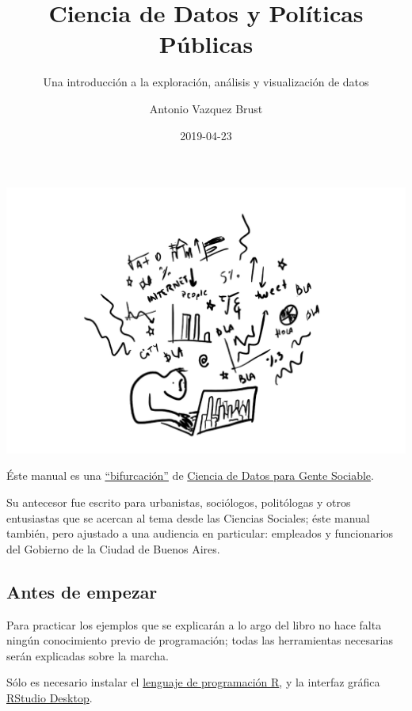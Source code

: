 \documentclass[]{book}
\title{Ciencia de Datos y Políticas Públicas}
\subtitle{Una introducción a la exploración, análisis y visualización de datos}
\author{Antonio Vazquez Brust}
\date{2019-04-23}
\begin{document}
\maketitle

{
\setcounter{tocdepth}{1}
\tableofcontents
}
\chapter*{}\label{section}

\includegraphics[width=1\linewidth]{imagenes/portada}

Éste manual es una
\href{https://es.wikipedia.org/wiki/Bifurcaci\%C3\%B3n_(desarrollo_de_software)}{``bifurcación''}
de
\href{https://bitsandbricks.github.io/ciencia_de_datos_gente_sociable/}{Ciencia
de Datos para Gente Sociable}.

Su antecesor fue escrito para urbanistas, sociólogos, politólogas y
otros entusiastas que se acercan al tema desde las Ciencias Sociales;
éste manual también, pero ajustado a una audiencia en particular:
empleados y funcionarios del Gobierno de la Ciudad de Buenos Aires.

\section*{Antes de empezar}\label{antes-de-empezar}

Para practicar los ejemplos que se explicarán a lo argo del libro no
hace falta ningún conocimiento previo de programación; todas las
herramientas necesarias serán explicadas sobre la marcha.

Sólo es necesario instalar el
\href{https://cloud.r-project.org/}{lenguaje de programación R}, y la
interfaz gráfica
\href{https://www.rstudio.com/products/rstudio/download/}{RStudio
Desktop}.
\end{document}
